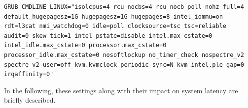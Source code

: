 \documentclass[MMR,Master,english]{style/twbook}
\begin{document}
\vspace{2em}
\begin{lstlisting}[name={Kernel Configurations for Real-Time Performance},label={script:kernel_cli}]
		GRUB_CMDLINE_LINUX="isolcpus=4 rcu_nocbs=4 rcu_nocb_poll nohz_full=4 default_hugepagesz=1G hugepagesz=1G hugepages=8 intel_iommu=on rdt=l3cat nmi_watchdog=0 idle=poll clocksource=tsc tsc=reliable audit=0 skew_tick=1 intel_pstate=disable intel.max_cstate=0 intel_idle.max_cstate=0 processor.max_cstate=0 processor_idle.max_cstate=0 nosoftlockup no_timer_check nospectre_v2 spectre_v2_user=off kvm.kvmclock_periodic_sync=N kvm_intel.ple_gap=0 irqaffinity=0"
\end{lstlisting}

\noindent In the following, these settings along with their impact on system latency are briefly described.
\end{document}
